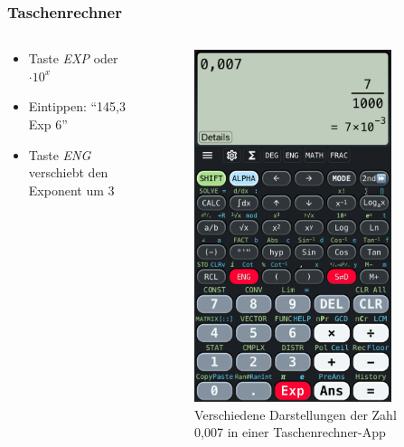 \begin{frame}
\frametitle{Taschenrechner}
\begin{columns}
    \begin{column}{0.73\textwidth}
    \begin{itemize}
  \item Taste \emph{EXP} oder $\cdot 10^x$
  \item Eintippen: \enquote{145,3 Exp 6}
  \item Taste \emph{ENG} verschiebt den Exponent um 3
  \end{itemize}

    \end{column}
   \begin{column}{0.25\textwidth}
       
\begin{figure}
    \includegraphics[width=0.85\textwidth]{foto/172}
    \caption{\scriptsize Verschiedene Darstellungen der Zahl 0,007 in einer Taschenrechner-App}
    \label{e_taschenrechner}
\end{figure}

   \end{column}
\end{columns}

\end{frame}

